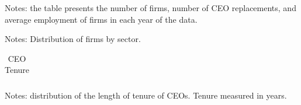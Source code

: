 \documentclass[11pt,a4paper]{article}
\newcommand{\tablepath}{papers/econometrics/table}
\begin{document}
\begin{table}%
    \centering
    \caption{Company-Year Characteristics}
    \vspace{.2cm}
    \label{tab:year_desc}
    
    \begin{minipage}{9cm}
    \vspace{.2cm}
    \footnotesize{Notes: the table presents the number of firms, number of CEO replacements, and average employment of firms in each year of the data.}
    \end{minipage}
\end{table}
\vspace{.5cm}


\begin{table}[H]
    \centering
    \caption{Industrial Distribution of Firms}
    \vspace{.2cm}
    \label{tab:industry_desc}
    
    \begin{minipage}{13cm}
    \vspace{.2cm}
    \footnotesize{Notes: Distribution of firms by sector.}
    \end{minipage}
\end{table}
\vspace{.5cm}


\begin{table}[H]
    \centering
    \caption{CEO Tenure}
    \vspace{.2cm}
    \label{tab:tenure_desc}
    \begin{tabular}{lcccc}
    
    \end{tabular}
    \begin{minipage}{10cm}
    \vspace{.2cm}
    \footnotesize{Notes: distribution of the length of tenure of CEOs. Tenure measured in years.}
    \end{minipage}
\end{table}
\vspace{.5cm}
\end{document}
